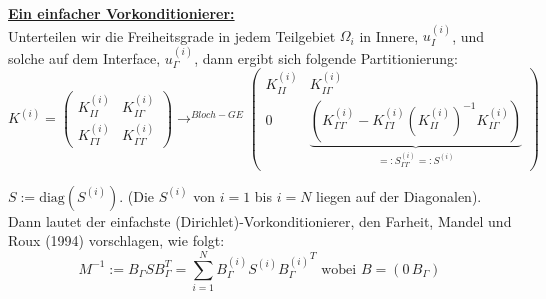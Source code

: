 \underline{\textbf{Ein einfacher Vorkonditionierer:}}\\
Unterteilen wir die Freiheitsgrade in jedem Teilgebiet $\Omega_i$ in Innere, $u^{(i)}_I$, und solche auf dem Interface, $u^{(i)}_\Gamma$, dann ergibt sich folgende Partitionierung:
\[K^{(i)}=\begin{pmatrix} K^{(i)}_{II} & K^{(i)}_{I\Gamma} \\
  K^{(i)}_{\Gamma I} & K^{(i)}_{\Gamma \Gamma} \end{pmatrix} 
 \longrightarrow^{Bloch-GE} 
 \begin{pmatrix} K^{(i)}_{II} & K^{(i)}_{I\Gamma} \\
0 & \underbrace{(K^{(i)}_{\Gamma \Gamma}-K^{(i)}_{\Gamma I} (K^{(i)}_{II})^{-1} K^{(i)}_{I \Gamma })}_{=: S^{(i)}_{\Gamma \Gamma}=: S^{(i)}}
\end{pmatrix} 
\]
\begin{definition}
$S:= \text{diag} (S^{(i)}) $. (Die $S^{(i)}$ von $i=1$ bis $i=N$ liegen auf der Diagonalen). Dann lautet der einfachste (Dirichlet)-Vorkonditionierer, den Farheit, Mandel und Roux (1994) vorschlagen, wie folgt:
\[M^{-1} := B_\Gamma S B^T_\Gamma = \sum_{i=1}^N B^{(i)}_\Gamma S^{(i)} {B^{(i)}_\Gamma}^T \text{ wobei } B=(0 \, B_\Gamma ) \]
\end{definition}

